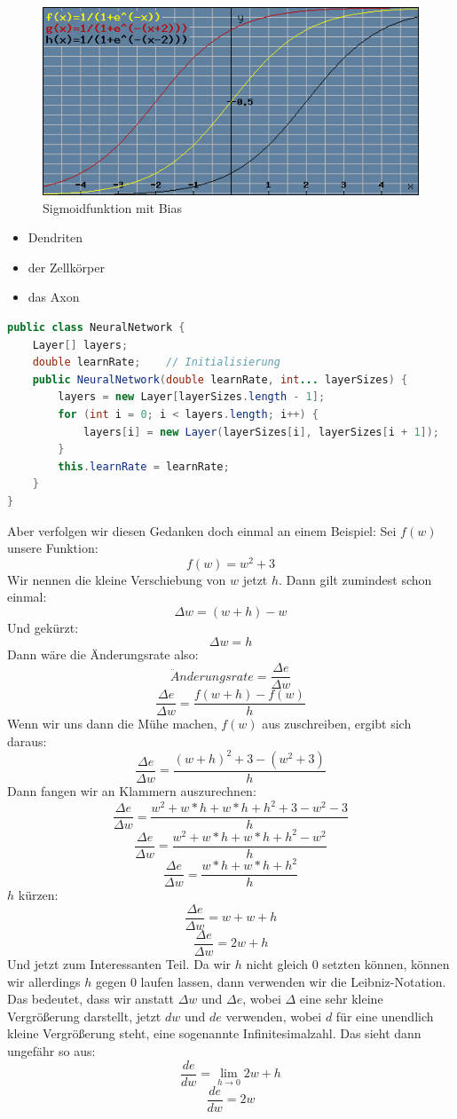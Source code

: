 \documentclass[12pt]{article}
\begin{document}
\begin{figure}[H]
\centering
\includegraphics[scale=0.60]{./Images/Pasted image 20231005145933.png}
\caption{Sigmoidfunktion mit Bias}
\label{Sigmoid-Funktion mit Bias}
\end{figure}


\begin{itemize}
  \item Dendriten
  \item der Zellkörper
  \item das Axon
\end{itemize}

\begin{lstlisting}[language=Java]
public class NeuralNetwork {
    Layer[] layers;
    double learnRate;    // Initialisierung
    public NeuralNetwork(double learnRate, int... layerSizes) {
        layers = new Layer[layerSizes.length - 1];
        for (int i = 0; i < layers.length; i++) {
            layers[i] = new Layer(layerSizes[i], layerSizes[i + 1]);
        }
        this.learnRate = learnRate;
    }
}
\end{lstlisting}

Aber verfolgen wir diesen Gedanken doch einmal an einem Beispiel:
Sei $f(w)$ unsere Funktion: $$f(w)=w^2+3$$
Wir nennen die kleine Verschiebung von $w$ jetzt $h$.
Dann gilt zumindest schon einmal: $$\Delta w=(w+h)-w$$Und gekürzt:$$\Delta w=h$$
Dann wäre die Änderungsrate also:$$\ddot{A}nderungsrate = \frac{\Delta e}{\Delta w}$$ $$\frac{\Delta e}{\Delta w}=\frac{f(w+h)-f(w)}{h}$$
Wenn wir uns dann die Mühe machen, $f(w)$ aus zuschreiben, ergibt sich daraus:
$$\frac{\Delta e}{\Delta w}=\frac{(w+h)^2+3-(w^2+3)}{h}$$
Dann fangen wir an Klammern auszurechnen:
$$\frac{\Delta e}{\Delta w}=\frac{w^2+w*h+w*h+h^2+3-w^2-3}{h}$$
$$\frac{\Delta e}{\Delta w}=\frac{w^2+w*h+w*h+h^2-w^2}{h}$$
$$\frac{\Delta e}{\Delta w}=\frac{w*h+w*h+h^2}{h}$$
$h$ kürzen:
$$\frac{\Delta e}{\Delta w}=w+w+h$$
$$\frac{\Delta e}{\Delta w}=2w+h$$Und jetzt zum Interessanten Teil. Da wir $h$ nicht gleich 0 setzten können, können wir allerdings $h$ gegen 0 laufen lassen, dann verwenden wir die Leibniz-Notation. Das bedeutet, dass wir anstatt  $\Delta w$ und  $\Delta e$, wobei $\Delta$ eine sehr kleine Vergrößerung darstellt, jetzt $dw$ und $de$ verwenden, wobei $d$ für eine unendlich kleine Vergrößerung steht, eine sogenannte Infinitesimalzahl.
Das sieht dann ungefähr so aus:
$$\frac{de}{dw}=\lim_{h\to 0} 2w +h$$
$$\frac{de}{dw}=2w$$
\end{document}
